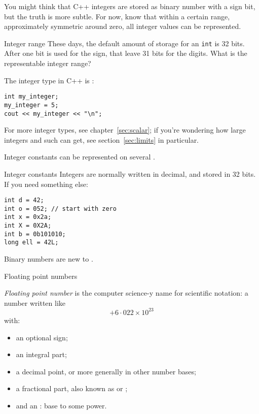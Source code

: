 You might think that C++ integers are stored as binary number with a sign  bit,
but the truth is more subtle.
For now, know that 
within a certain range, approximately symmetric around zero,
all integer values can be represented.

\begin{exercise}{Integer range}
  \label{ex:int-range}
  These days, the default amount of storage for an \lstinline{int} is
  32 bits. After one bit is used for the sign, that leave 31 bits for
  the digits. What is the representable integer range?
\end{exercise}

The integer type in C++ is :
\begin{lstlisting}
int my_integer;
my_integer = 5;
cout << my_integer << "\n";
\end{lstlisting}

For more integer types, see chapter~\ref{sec:scalar};
if you're wondering how large integers and such can get,
see section~\ref{sec:limits} in particular.

Integer constants can be represented on several .

\begin{block}{Integer constants}
  \label{sl:intvals}
  Integers are normally  written in decimal, and stored in 32 bits.
  If you need something else:
\begin{lstlisting}
int d = 42;
int o = 052; // start with zero
int x = 0x2a;
int X = 0X2A;
int b = 0b101010;
long ell = 42L;
\end{lstlisting}
\end{block}

Binary numbers are new to .

 {Floating point numbers}

\emph{Floating point number}
is the computer science-y name for scientific notation:
a number written like
\[ +6\cdot 022 \times 10^{23} \]
with:
\begin{itemize}
\item an optional sign;
\item an integral part;
\item a decimal point, or more generally 
  in other number bases;
\item a fractional part, also known as 
  or ;
\item and an : base to some power.
\end{itemize}

